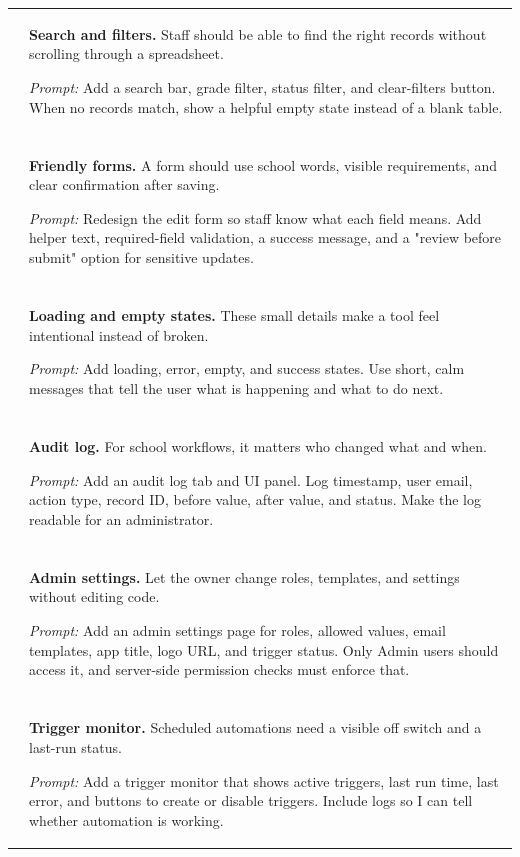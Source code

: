 \documentclass[10pt]{article}
\makeatletter
\newcommand{\uiwindow}[2]{
\begin{tikzpicture}[x=1cm,y=1cm]
  \draw[rounded corners=3pt, fill=white, draw=GCLine] (0,0) rectangle (5.9,3.0);
  \draw[fill=GCPanel, draw=GCLine] (0,2.55) rectangle (5.9,3.0);
  \fill[GCTeal] (0.28,2.77) circle (0.06);
  \fill[GCMuted] (0.50,2.77) circle (0.06);
  \fill[GCLine] (0.72,2.77) circle (0.06);
  \node[anchor=west, text=GCMuted, font=\scriptsize] at (1.0,2.77) {#1};
  #2
\end{tikzpicture}
}
\newcommand{\FilterVisual}{
\uiwindow{Search and filters}{
  \draw[rounded corners=2pt, fill=white, draw=GCLine] (0.45,1.82) rectangle (3.05,2.22);
  \node[anchor=west, text=GCMuted, font=\tiny] at (0.62,2.02) {Search by student ID...};
  \draw[rounded corners=2pt, fill=GCPanel, draw=GCLine] (3.28,1.82) rectangle (4.25,2.22);
  \node[text=GCNavy, font=\tiny] at (3.76,2.02) {Grade};
  \draw[rounded corners=2pt, fill=GCPanel, draw=GCLine] (4.45,1.82) rectangle (5.42,2.22);
  \node[text=GCNavy, font=\tiny] at (4.94,2.02) {Status};
  \draw[GCLine] (0.55,1.42) -- (5.35,1.42);
  \draw[GCLine] (0.55,1.04) -- (5.35,1.04);
  \draw[GCLine] (0.55,0.66) -- (5.35,0.66);
  \node[anchor=west, text=GCMuted, font=\tiny] at (0.70,1.22) {S1001  |  Grade 9  |  High};
  \node[anchor=west, text=GCMuted, font=\tiny] at (0.70,0.84) {S1002  |  Grade 10 |  Open};
}}
\newcommand{\FormVisual}{
\uiwindow{Friendly form}{
  \node[anchor=west, text=GCNavy, font=\scriptsize\bfseries] at (0.55,2.20) {Update follow-up};
  \draw[rounded corners=2pt, fill=white, draw=GCLine] (0.55,1.48) rectangle (2.75,1.86);
  \node[anchor=west, text=GCMuted, font=\tiny] at (0.68,1.67) {Status};
  \draw[rounded corners=2pt, fill=white, draw=GCLine] (3.05,1.48) rectangle (5.25,1.86);
  \node[anchor=west, text=GCMuted, font=\tiny] at (3.18,1.67) {Owner};
  \draw[rounded corners=2pt, fill=white, draw=GCLine] (0.55,0.72) rectangle (5.25,1.28);
  \node[anchor=west, text=GCMuted, font=\tiny] at (0.68,1.00) {Notes: short update, no private details};
  \draw[rounded corners=2pt, fill=GCTeal, draw=GCTeal] (3.85,0.30) rectangle (5.25,0.62);
  \node[text=white, font=\tiny] at (4.55,0.46) {Save update};
}}
\newcommand{\LoadingVisual}{
\uiwindow{Loading and empty states}{
  \draw[rounded corners=2pt, fill=GCPanel, draw=GCLine] (0.55,1.55) rectangle (5.25,2.15);
  \node[anchor=west, text=GCMuted, font=\tiny] at (0.78,1.85) {Loading records...};
  \draw[rounded corners=2pt, fill=white, draw=GCLine] (0.55,0.55) rectangle (5.25,1.25);
  \node[text=GCNavy, font=\scriptsize\bfseries] at (2.90,0.95) {No records match these filters};
  \node[text=GCMuted, font=\tiny] at (2.90,0.72) {Try clearing grade or status.};
}}
\newcommand{\AuditVisual}{
\uiwindow{Audit log}{
  \node[anchor=west, text=GCNavy, font=\scriptsize\bfseries] at (0.55,2.20) {Recent changes};
  \draw[GCLine] (0.55,1.75) -- (5.35,1.75);
  \draw[GCLine] (0.55,1.28) -- (5.35,1.28);
  \draw[GCLine] (0.55,0.81) -- (5.35,0.81);
  \node[anchor=west, text=GCMuted, font=\tiny] at (0.65,1.52) {9:04 AM | admin@school.org | Status changed};
  \node[anchor=west, text=GCMuted, font=\tiny] at (0.65,1.05) {9:12 AM | counselor@school.org | Note added};
  \node[anchor=west, text=GCMuted, font=\tiny] at (0.65,0.58) {9:18 AM | system trigger | Draft created};
}}
\newcommand{\AdminVisual}{
\uiwindow{Admin settings}{
  \draw[rounded corners=2pt, fill=GCPanel, draw=GCLine] (0.50,0.55) rectangle (1.65,2.25);
  \node[text=GCNavy, font=\tiny\bfseries] at (1.08,2.02) {Settings};
  \node[text=GCMuted, font=\tiny] at (1.08,1.65) {Roles};
  \node[text=GCMuted, font=\tiny] at (1.08,1.30) {Templates};
  \node[text=GCMuted, font=\tiny] at (1.08,0.95) {Triggers};
  \draw[rounded corners=2pt, fill=white, draw=GCLine] (1.95,1.55) rectangle (5.35,2.25);
  \node[anchor=west, text=GCMuted, font=\tiny] at (2.12,1.92) {Admin email: admin@school.org};
  \draw[rounded corners=2pt, fill=white, draw=GCLine] (1.95,0.55) rectangle (5.35,1.30);
  \node[anchor=west, text=GCMuted, font=\tiny] at (2.12,0.93) {Trigger status: daily summary is on};
}}
\newcommand{\TriggerVisual}{
\uiwindow{Trigger monitor}{
  \node[anchor=west, text=GCNavy, font=\scriptsize\bfseries] at (0.55,2.20) {Automation health};
  \draw[rounded corners=2pt, fill=GCPanel, draw=GCLine] (0.55,1.25) rectangle (2.50,1.85);
  \node[text=GCNavy, font=\tiny\bfseries] at (1.52,1.62) {Daily summary};
  \node[text=GCMuted, font=\tiny] at (1.52,1.40) {Last run: 7:00 AM};
  \draw[rounded corners=2pt, fill=GCPanel, draw=GCLine] (2.85,1.25) rectangle (5.25,1.85);
  \node[text=GCNavy, font=\tiny\bfseries] at (4.05,1.62) {Email drafts};
  \node[text=GCMuted, font=\tiny] at (4.05,1.40) {12 created, 0 sent};
  \draw[rounded corners=2pt, fill=GCDark, draw=GCDark] (3.65,0.55) rectangle (5.25,0.92);
  \node[text=white, font=\tiny] at (4.45,0.74) {Disable trigger};
}}
\makeatother
\begin{document}
\begin{longtable}{p{}p{}}
\FilterVisual &
\textbf{Search and filters.} Staff should be able to find the right records without scrolling through a spreadsheet.

\textit{Prompt:} Add a search bar, grade filter, status filter, and clear-filters button. When no records match, show a helpful empty state instead of a blank table. \\
\\[-0.5em]
\FormVisual &
\textbf{Friendly forms.} A form should use school words, visible requirements, and clear confirmation after saving.

\textit{Prompt:} Redesign the edit form so staff know what each field means. Add helper text, required-field validation, a success message, and a "review before submit" option for sensitive updates. \\
\\[-0.5em]
\LoadingVisual &
\textbf{Loading and empty states.} These small details make a tool feel intentional instead of broken.

\textit{Prompt:} Add loading, error, empty, and success states. Use short, calm messages that tell the user what is happening and what to do next. \\
\\[-0.5em]
\AuditVisual &
\textbf{Audit log.} For school workflows, it matters who changed what and when.

\textit{Prompt:} Add an audit log tab and UI panel. Log timestamp, user email, action type, record ID, before value, after value, and status. Make the log readable for an administrator. \\
\\[-0.5em]
\AdminVisual &
\textbf{Admin settings.} Let the owner change roles, templates, and settings without editing code.

\textit{Prompt:} Add an admin settings page for roles, allowed values, email templates, app title, logo URL, and trigger status. Only Admin users should access it, and server-side permission checks must enforce that. \\
\\[-0.5em]
\TriggerVisual &
\textbf{Trigger monitor.} Scheduled automations need a visible off switch and a last-run status.

\textit{Prompt:} Add a trigger monitor that shows active triggers, last run time, last error, and buttons to create or disable triggers. Include logs so I can tell whether automation is working. \\
\end{longtable}
\end{document}
